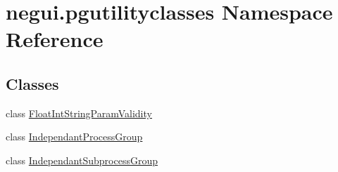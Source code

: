 \hypertarget{namespacenegui_1_1pgutilityclasses}{}\section{negui.\+pgutilityclasses Namespace Reference}
\label{namespacenegui_1_1pgutilityclasses}
\subsection*{Classes}
\begin{DoxyCompactItemize}
\item 
class \hyperlink{classnegui_1_1pgutilityclasses_1_1FloatIntStringParamValidity}{Float\+Int\+String\+Param\+Validity}
\item 
class \hyperlink{classnegui_1_1pgutilityclasses_1_1IndependantProcessGroup}{Independant\+Process\+Group}
\item 
class \hyperlink{classnegui_1_1pgutilityclasses_1_1IndependantSubprocessGroup}{Independant\+Subprocess\+Group}
\end{DoxyCompactItemize}
